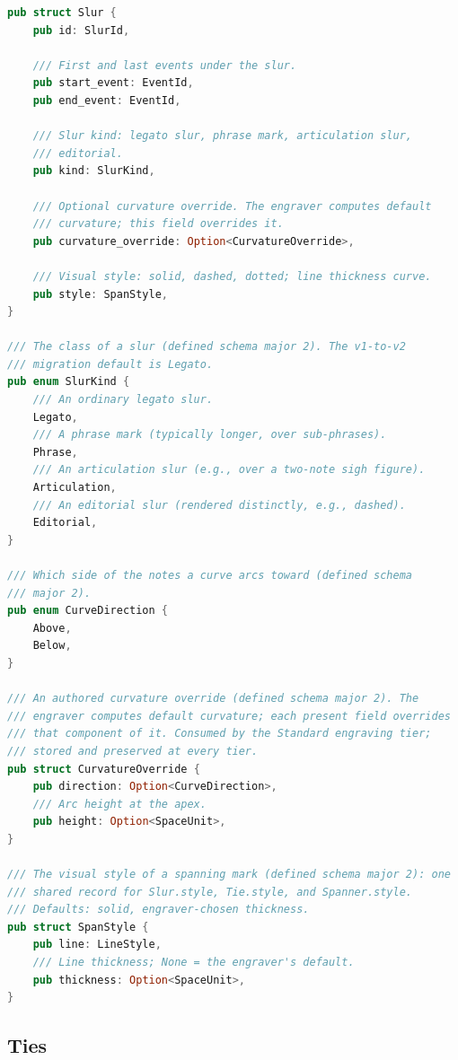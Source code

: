 \documentclass[11pt,letterpaper]{report}
\begin{document}
\begin{lstlisting}[language=Rust]
pub struct Slur {
    pub id: SlurId,

    /// First and last events under the slur.
    pub start_event: EventId,
    pub end_event: EventId,

    /// Slur kind: legato slur, phrase mark, articulation slur,
    /// editorial.
    pub kind: SlurKind,

    /// Optional curvature override. The engraver computes default
    /// curvature; this field overrides it.
    pub curvature_override: Option<CurvatureOverride>,

    /// Visual style: solid, dashed, dotted; line thickness curve.
    pub style: SpanStyle,
}

/// The class of a slur (defined schema major 2). The v1-to-v2
/// migration default is Legato.
pub enum SlurKind {
    /// An ordinary legato slur.
    Legato,
    /// A phrase mark (typically longer, over sub-phrases).
    Phrase,
    /// An articulation slur (e.g., over a two-note sigh figure).
    Articulation,
    /// An editorial slur (rendered distinctly, e.g., dashed).
    Editorial,
}

/// Which side of the notes a curve arcs toward (defined schema
/// major 2).
pub enum CurveDirection {
    Above,
    Below,
}

/// An authored curvature override (defined schema major 2). The
/// engraver computes default curvature; each present field overrides
/// that component of it. Consumed by the Standard engraving tier;
/// stored and preserved at every tier.
pub struct CurvatureOverride {
    pub direction: Option<CurveDirection>,
    /// Arc height at the apex.
    pub height: Option<SpaceUnit>,
}

/// The visual style of a spanning mark (defined schema major 2): one
/// shared record for Slur.style, Tie.style, and Spanner.style.
/// Defaults: solid, engraver-chosen thickness.
pub struct SpanStyle {
    pub line: LineStyle,
    /// Line thickness; None = the engraver's default.
    pub thickness: Option<SpaceUnit>,
}
\end{lstlisting}

\subsection{Ties}
\label{sec:graph:ties}
\end{document}
